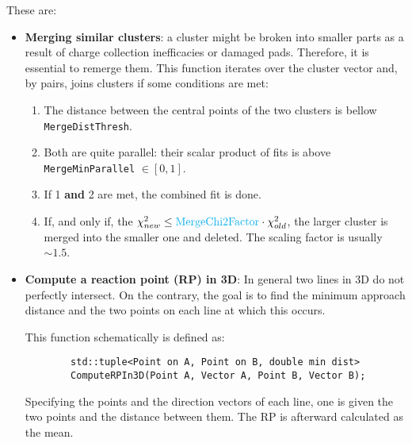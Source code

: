 \documentclass[11pt, a4paper, english]{article}
\begin{document}
These are:
\begin{itemize}
	\item \textbf{Merging similar clusters}: a cluster might be broken into smaller parts as a result of charge collection inefficacies or damaged pads. Therefore, it is essential to remerge them. This function iterates over the cluster vector and, by pairs, joins clusters if some conditions are met:
	      \begin{enumerate}
		      \item The distance between the central points of the two clusters is bellow \lstinline|MergeDistThresh|.
		      \item Both are quite parallel: their scalar product of fits is above \lstinline|MergeMinParallel| $\in [0, 1]$.
		      \item If 1 \textbf{and} 2 are met, the combined fit is done.
		      \item If, and only if, the $\chi^2_{new} \leq \textcolor{ProcessBlue}{\text{MergeChi2Factor}} \cdot \chi^2_{old}$, the larger cluster is merged into the smaller one and deleted. The scaling factor is usually $\sim \num{1.5}$.
	      \end{enumerate}
	\item \textbf{Compute a reaction point (RP) in 3D}: In general two lines in 3D do not perfectly intersect. On the contrary, the goal is to find the minimum approach distance and the two points on each line at which this occurs. 
	
	This function schematically is defined as:
	\begin{lstlisting}
		std::tuple<Point on A, Point on B, double min dist> 
		ComputeRPIn3D(Point A, Vector A, Point B, Vector B);
	\end{lstlisting}
	Specifying the points and the direction vectors of each line, one is given the two points and the distance between them. The RP is afterward calculated as the mean.
\end{itemize}



\printbibliography
\end{document}
